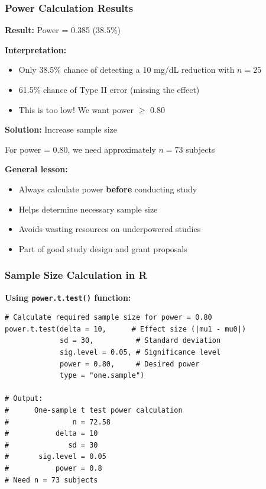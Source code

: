 \documentclass{beamer}
\begin{document}
\begin{frame}
\frametitle{Power Calculation Results}
\textbf{Result:} Power = 0.385 (38.5\%)

\vspace{0.3cm}
\textbf{Interpretation:}
\begin{itemize}
\item Only 38.5\% chance of detecting a 10 mg/dL reduction with $n=25$
\item 61.5\% chance of Type II error (missing the effect)
\item This is too low! We want power $\geq$ 0.80
\end{itemize}

\vspace{0.3cm}
\textbf{Solution:} Increase sample size

\vspace{0.2cm}
For power = 0.80, we need approximately $n = 73$ subjects

\vspace{0.2cm}
\textbf{General lesson:}
\begin{itemize}
\item Always calculate power \textbf{before} conducting study
\item Helps determine necessary sample size
\item Avoids wasting resources on underpowered studies
\item Part of good study design and grant proposals
\end{itemize}
\end{frame}

\begin{frame}[fragile]
\frametitle{Sample Size Calculation in R}
\textbf{Using \texttt{power.t.test()} function:}

\vspace{0.2cm}
\footnotesize
\begin{verbatim}
# Calculate required sample size for power = 0.80
power.t.test(delta = 10,      # Effect size (|mu1 - mu0|)
             sd = 30,          # Standard deviation
             sig.level = 0.05, # Significance level
             power = 0.80,     # Desired power
             type = "one.sample")

# Output:
#      One-sample t test power calculation
#               n = 72.58
#           delta = 10
#              sd = 30
#       sig.level = 0.05
#           power = 0.8
# Need n = 73 subjects
\end{verbatim}
\end{frame}
\end{document}
